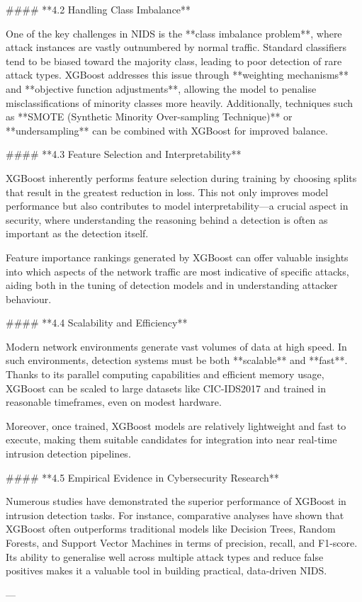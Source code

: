 #### **4.2 Handling Class Imbalance**

One of the key challenges in NIDS is the **class imbalance problem**, where attack instances are vastly outnumbered by normal traffic. Standard classifiers tend to be biased toward the majority class, leading to poor detection of rare attack types. XGBoost addresses this issue through **weighting mechanisms** and **objective function adjustments**, allowing the model to penalise misclassifications of minority classes more heavily. Additionally, techniques such as **SMOTE (Synthetic Minority Over-sampling Technique)** or **undersampling** can be combined with XGBoost for improved balance.

#### **4.3 Feature Selection and Interpretability**

XGBoost inherently performs feature selection during training by choosing splits that result in the greatest reduction in loss. This not only improves model performance but also contributes to model interpretability—a crucial aspect in security, where understanding the reasoning behind a detection is often as important as the detection itself.

Feature importance rankings generated by XGBoost can offer valuable insights into which aspects of the network traffic are most indicative of specific attacks, aiding both in the tuning of detection models and in understanding attacker behaviour.

#### **4.4 Scalability and Efficiency**

Modern network environments generate vast volumes of data at high speed. In such environments, detection systems must be both **scalable** and **fast**. Thanks to its parallel computing capabilities and efficient memory usage, XGBoost can be scaled to large datasets like CIC-IDS2017 and trained in reasonable timeframes, even on modest hardware.

Moreover, once trained, XGBoost models are relatively lightweight and fast to execute, making them suitable candidates for integration into near real-time intrusion detection pipelines.

#### **4.5 Empirical Evidence in Cybersecurity Research**

Numerous studies have demonstrated the superior performance of XGBoost in intrusion detection tasks. For instance, comparative analyses have shown that XGBoost often outperforms traditional models like Decision Trees, Random Forests, and Support Vector Machines in terms of precision, recall, and F1-score. Its ability to generalise well across multiple attack types and reduce false positives makes it a valuable tool in building practical, data-driven NIDS.

---

